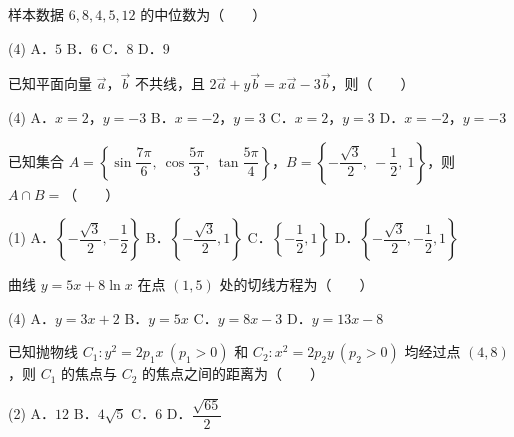 \begin{question}
样本数据 $6,8,4,5,12$ 的中位数为\mbox{（　　）}

\begin{gkopts}(4)
\task A．$5$
\task B．$6$
\task C．$8$
\task D．$9$
\end{gkopts}

\end{question}
\begin{question}
已知平面向量 $\vec{a}$，$\vec{b}$ 不共线，且 $2\vec{a}+y\vec{b}=x\vec{a}-3\vec{b}$，则\mbox{（　　）}

\begin{gkopts}(4)
\task A．$x=2$，$y=-3$
\task B．$x=-2$，$y=3$
\task C．$x=2$，$y=3$
\task D．$x=-2$，$y=-3$
\end{gkopts}

\end{question}
\begin{question}
已知集合 $A=\left\{\sin\dfrac{7\pi}{6},\ \cos\dfrac{5\pi}{3},\ \tan\dfrac{5\pi}{4}\right\}$，$B=\left\{-\dfrac{\sqrt{3}}{2},\ -\dfrac{1}{2},\ 1\right\}$，则 $A\cap B=$\mbox{（　　）}

\begin{gkopts}(1)
\task A．$\left\{-\dfrac{\sqrt{3}}{2},-\dfrac{1}{2}\right\}$
\task B．$\left\{-\dfrac{\sqrt{3}}{2},1\right\}$
\task C．$\left\{-\dfrac{1}{2},1\right\}$
\task D．$\left\{-\dfrac{\sqrt{3}}{2},-\dfrac{1}{2},1\right\}$
\end{gkopts}

\end{question}
\begin{question}
曲线 $y=5x+8\ln x$ 在点 $(1,5)$ 处的切线方程为\mbox{（　　）}

\begin{gkopts}(4)
\task A．$y=3x+2$
\task B．$y=5x$
\task C．$y=8x-3$
\task D．$y=13x-8$
\end{gkopts}

\end{question}
\begin{question}
已知抛物线 $C_1:y^2=2p_1x\ (p_1>0)$ 和 $C_2:x^2=2p_2y\ (p_2>0)$ 均经过点 $(4,8)$，则 $C_1$ 的焦点与 $C_2$ 的焦点之间的距离为\mbox{（　　）}

\begin{gkopts}(2)
\task A．$12$
\task B．$4\sqrt{5}$
\task C．$6$
\task D．$\dfrac{\sqrt{65}}{2}$
\end{gkopts}

\end{question}
